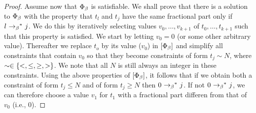 \begin{proof}
Assume now that $\Phi_{\beta}$ is satisfiable.
We shall prove that
there is a solution to  $\Phi_{\beta}$ with the property that
$t_l$ and $t_j$ have the same fractional part only if
$l \ {\rightarrow_{\beta}}^*\  j$. We do this by iteratively selecting
values $v_0, \ldots , v_{k+1}$ of $t_0, \ldots , t_{k+1}$ such that this
property is satisfied.
We start by letting $v_0 = 0$ (or some other arbitrary value). Thereafter
we replace $t_o$ by its value ($v_0$) in $[\Phi_{\beta}]$ and
simplify all constraints that contain $v_0$ so that they become 
constraints of form $t_j \sim N$, where $\sim \in \lbrace <,\leq,\geq,>\rbrace$.
We note that all $N$ is still always an integer in these constraints.
Using the above properties of $[\Phi_{\beta}]$, it follows that
if we obtain both a constraint of form $t_j \leq N$ and of form $t_j \geq N$
then $0 \ {\rightarrow_{\beta}}^*\  j$.
If not $0 \ {\rightarrow_{\beta}}^*\  j$,
we can therefore choose a value $v_1$ for $t_1$ with a fractional part differen
from that of $v_0$ (i.e., $0$).


\end{proof}
